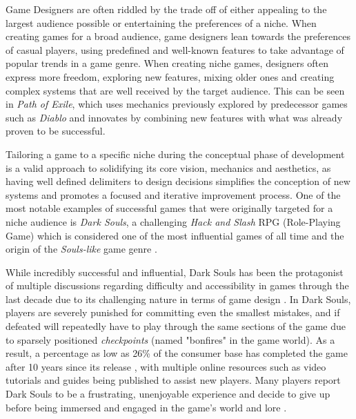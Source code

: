 Game Designers are often riddled by the trade off of either appealing to the largest audience possible or entertaining the preferences of a niche. When creating games for a broad audience, game designers lean towards the preferences of casual players, using predefined and well-known features to take advantage of popular trends in a game genre. When creating niche games, designers often express more freedom, exploring new features, mixing older ones and creating complex systems that are well received by the target audience. This can be seen in \emph{Path of Exile}, which uses mechanics previously explored by predecessor games such as \emph{Diablo} and innovates by combining new features with what was already proven to be successful.

Tailoring a game to a specific niche during the conceptual phase of development is a valid approach to solidifying its core vision, mechanics and aesthetics, as having well defined delimiters to design decisions simplifies the conception of new systems and promotes a focused and iterative improvement process. One of the most notable examples of successful games that were originally targeted for a niche audience is \emph{Dark Souls}, a challenging \emph{Hack and Slash} RPG (Role-Playing Game) which is considered one of the most influential games of all time and  the origin of the \emph{Souls-like} game genre \cite{BOOK_DarkSoulsBeyondTheGrave}.

While incredibly successful and influential, Dark Souls has been the protagonist of multiple discussions regarding difficulty and accessibility in games through the last decade due to its challenging nature in terms of game design \cite{ONLINE_GettingWrongDarkSouls}. In Dark Souls, players are severely punished for committing even the smallest mistakes, and if defeated will repeatedly have to play through the same sections of the game due to sparsely positioned \emph{checkpoints} (named "bonfires" in the game world). As a result, a percentage as low as 26\% of the consumer base has completed the game after 10 years since its release \cite{ONLINE_ApproachabilityFixDarkSouls}, with multiple online resources such as video tutorials and guides being published to assist new players. Many players report Dark Souls to be a frustrating, unenjoyable experience and decide to give up before being immersed and engaged in the game's world and lore \cite{ONLINE_ToughLoveDarkSoulsDifficulty}.

